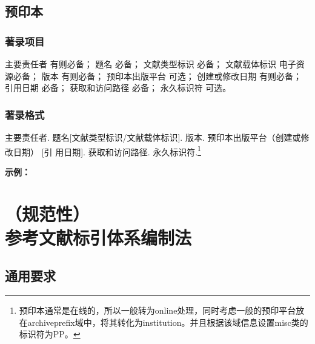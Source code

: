 \documentclass[twoside]{article}%
\begin{document}
\subsection{预印本}\label{sec:entrytype:preprint}


\subsubsection{著录项目}

主要责任者 有则必备；
题名 必备；
文献类型标识 必备；
文献载体标识 电子资源必备；
版本 有则必备；
预印本出版平台 可选；
创建或修改日期 有则必备；
引用日期 必备；
获取和访问路径 必备；
永久标识符 可选。

\subsubsection{著录格式}

主要责任者. 题名[文献类型标识/文献载体标识]. 版本. 预印本出版平台（创建或修改日期） [引
用日期]. 获取和访问路径. 永久标识符.\footnote{预印本通常是在线的，所以一般转为online处理，同时考虑一般的预印平台放在archiveprefix域中，将其转化为institution。并且根据该域信息设置misc类的标识符为PP。}

\begin{refsection}
\nocite{方向明2023元宇宙,肖玲2024数据,山东一医大2025,BLOSS2025trial,JENKINS2012light}


\textbf{示例：}

{\printbibliography[heading=none,env=indentegenv]}

\end{refsection}


\newpage
\appendix

\section[参考文献标引体系编制法]{（规范性）\\参考文献标引体系编制法}

\subsection{通用要求}
\end{document}
